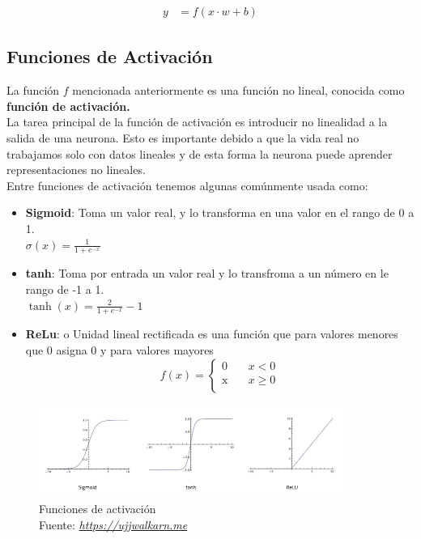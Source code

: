 \begin{equation}
\label{forma vectorial}
\begin{aligned}
y&=f(x\cdot w+b)
\end{aligned}
\end{equation}
\subsection{Funciones de Activación}
La función $f$ mencionada anteriormente es una función no lineal, conocida como \textbf{función de activación.}\\ La tarea principal de la función de activación es introducir no linealidad a la salida de una neurona. Esto es importante debido a que la vida real no trabajamos solo con datos lineales y de esta forma la neurona puede aprender representaciones no lineales.\\ Entre funciones de activación tenemos algunas comúnmente usada como:
\begin{itemize}
	\item \textbf{Sigmoid}: Toma un valor real, y lo transforma en una valor en el rango de 0 a 1.\\
	$ \sigma (x) = \frac{1}{1+e^{-x}}$
	\item \textbf{tanh}: Toma por entrada un valor real y lo transfroma a un número en le rango de -1 a 1.\\
	$\tanh (x)=\frac{2}{1+e^{-x}} -1$
	\item \textbf{ReLu}: o Unidad lineal rectificada es una función que para valores menores que 0 asigna 0 y para valores mayores 
	\[   
	f(x) = 
	\begin{cases}
	\text{0} &\quad x<0\\
	\text{x} &\quad x\geq0\\

	\end{cases}
	\]
\end{itemize}
\begin{figure}[H]
	\centering
	\includegraphics[width=0.9\textwidth]{Figures/factivacion.png}
	\caption{Funciones de activación \\ Fuente:  \href{https://ujjwalkarn.me/2016/08/09/quick-intro-neural-networks/}{\textit{https://ujjwalkarn.me}}}
	\label{activacion}
\end{figure} 

